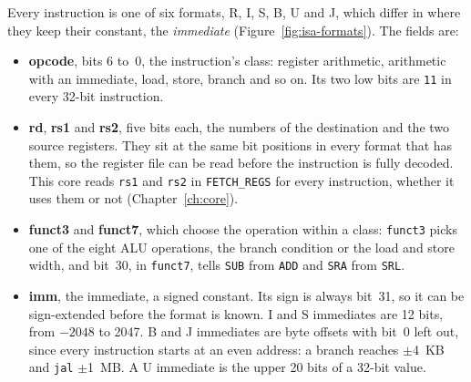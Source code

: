 \documentclass[11pt,a4paper]{report}
\begin{document}
Every instruction is one of six formats, R, I, S, B, U and J, which differ in where they keep
their constant, the \emph{immediate} (Figure~\ref{fig:isa-formats}). The fields are:

\begin{itemize}[leftmargin=*, itemsep=2pt]
  \item \textbf{opcode}, bits 6 to~0, the instruction's class: register arithmetic, arithmetic
    with an immediate, load, store, branch and so on. Its two low bits are \texttt{11} in
    every 32-bit instruction.
  \item \textbf{rd}, \textbf{rs1} and \textbf{rs2}, five bits each, the numbers of the
    destination and the two source registers. They sit at the same bit positions in every
    format that has them, so the register file can be read before the instruction is fully
    decoded. This core reads \texttt{rs1} and \texttt{rs2} in \texttt{FETCH\_REGS} for every
    instruction, whether it uses them or not (Chapter~\ref{ch:core}).
  \item \textbf{funct3} and \textbf{funct7}, which choose the operation within a class:
    \texttt{funct3} picks one of the eight ALU operations, the branch condition or the load
    and store width, and bit~30, in \texttt{funct7}, tells \texttt{SUB} from \texttt{ADD} and
    \texttt{SRA} from \texttt{SRL}.
  \item \textbf{imm}, the immediate, a signed constant. Its sign is always bit~31, so it can
    be sign-extended before the format is known. I and S immediates are 12 bits, from $-2048$
    to 2047. B and J immediates are byte offsets with bit~0 left out, since every instruction
    starts at an even address: a branch reaches $\pm$4~KB and \texttt{jal} $\pm$1~MB. A U
    immediate is the upper 20 bits of a 32-bit value.
\end{itemize}
\end{document}
